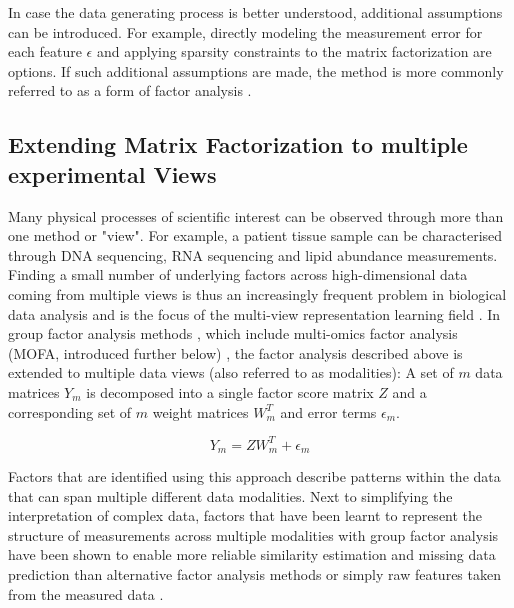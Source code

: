 \begin{flushleft}
In case the data generating process is better understood, additional assumptions can be introduced. For example, directly modeling the measurement error for each feature \(\epsilon\) and applying sparsity constraints to the matrix factorization are options. If such additional assumptions are made, the method is more commonly referred to as a form of factor analysis \citep{klamiGroupFactorAnalysis2014}.


\subsection{Extending Matrix Factorization to multiple experimental Views}

Many physical processes of scientific interest can be observed through more than one method or "view". For example, a patient tissue sample can be characterised through DNA sequencing, RNA sequencing and lipid abundance measurements. Finding a small number of underlying factors across high-dimensional data coming from multiple views is thus an increasingly frequent problem in biological data analysis and is the focus of the multi-view representation learning field \citep{liSurveyMultiViewRepresentation2019}. In group factor analysis methods \citep{virtanenBayesianGroupFactor2012, klamiGroupFactorAnalysis2014}, which include multi-omics factor analysis (MOFA, introduced further below) \citep{argelaguetMultiOmicsFactorAnalysis2018b, argelaguetMOFAStatisticalFramework2020a}, the factor analysis described above is extended to multiple data views (also referred to as modalities): A set of \(m\) data matrices \( Y_m \) is decomposed into a single factor score matrix \( Z \) and a corresponding set of \(m\) weight matrices \( W_m^T \) and error terms \(\epsilon_m\). 

\begin{equation}
    Y_m = ZW_m^T + \epsilon_m
\end{equation}

Factors that are identified using this approach describe patterns within the data that can span multiple different data modalities. Next to simplifying the interpretation of complex data, factors that have been learnt to represent the structure of measurements across multiple modalities with group factor analysis have been shown to enable more reliable similarity estimation and missing data prediction than alternative factor analysis methods or simply raw features taken from the measured data \citep{klamiGroupFactorAnalysis2014}.
\par


\end{flushleft}
